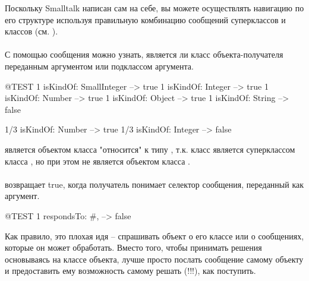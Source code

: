 \documentclass[a4paper,10pt,twoside]{book}
\begin{document}
Поскольку Smalltalk написан сам на себе, вы можете осуществлять навигацию по его структуре используя правильную комбинацию сообщений суперклассов и классов (см. ).

\paragraph{}
С помощью сообщения  можно узнать, является ли класс объекта-получателя переданным аргументом или подклассом аргумента.

\begin{code}{@TEST}
1 isKindOf: SmallInteger --> true
1 isKindOf: Integer          --> true
1 isKindOf: Number         --> true
1 isKindOf: Object           --> true
1 isKindOf: String            --> false

1/3 isKindOf: Number      --> true
1/3 isKindOf: Integer        --> false
\end{code}

 является объектом класса  "относится" к типу , т.к. класс  является суперклассом класса , но при этом  не является объектом класса .

\paragraph{}
 возвращает true, когда получатель понимает селектор сообщения, переданный как аргумент.

\begin{code}{@TEST}
1 respondsTo: #, --> false
\end{code}

Как правило, это плохая идя -- спрашивать объект о его классе или о сообщениях, которые он может обработать.
Вместо того, чтобы принимать решения основываясь на классе объекта, лучше просто послать сообщение самому объекту и предоставить ему возможность самому решать (!!!), как поступить.
\end{document}
